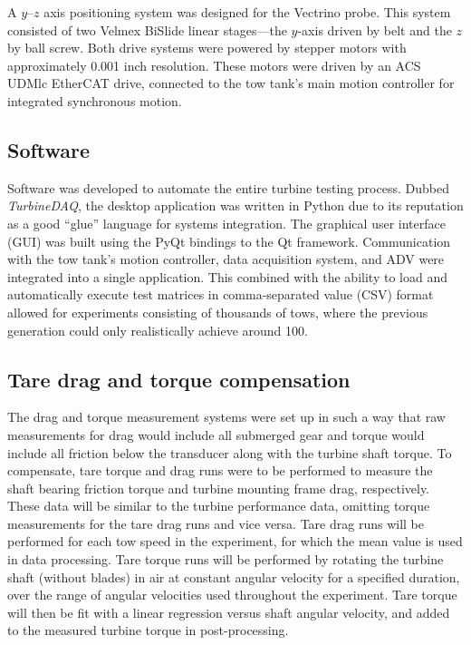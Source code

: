A $y$--$z$ axis positioning system was designed for the Vectrino probe. This
system consisted of two Velmex BiSlide linear stages---the $y$-axis driven by
belt and the $z$ by ball screw. Both drive systems were powered by stepper
motors with approximately 0.001 inch resolution. These motors were driven by an
ACS UDMlc EtherCAT drive, connected to the tow tank's main motion controller for
integrated synchronous motion.



\subsection{Software}

Software was developed to automate the entire turbine testing process. Dubbed
\textit{TurbineDAQ}, the desktop application was written in Python due to its
reputation as a good ``glue'' language for systems integration. The graphical
user interface (GUI) was built using the PyQt bindings to the Qt framework.
Communication with the tow tank's motion controller, data acquisition system,
and ADV were integrated into a single application. This combined with the
ability to load and automatically execute test matrices in comma-separated value
(CSV) format allowed for experiments consisting of thousands of tows, where the
previous generation could only realistically achieve around 100.


\subsection{Tare drag and torque compensation} 

The drag and torque measurement systems were set up in such a way that raw
measurements for drag would include all submerged gear and torque would include
all friction below the transducer along with the turbine shaft torque. To
compensate, tare torque and drag runs were to be performed to measure the shaft
bearing friction torque and turbine mounting frame drag, respectively. These
data will be similar to the turbine performance data, omitting torque
measurements for the tare drag runs and vice versa. Tare drag runs will be
performed for each tow speed in the experiment, for which the mean value is used
in data processing. Tare torque runs will be performed by rotating the turbine
shaft (without blades) in air at constant angular velocity for a specified
duration, over the range of angular velocities used throughout the experiment.
Tare torque will then be fit with a linear regression versus shaft angular
velocity, and added to the measured turbine torque in post-processing.


